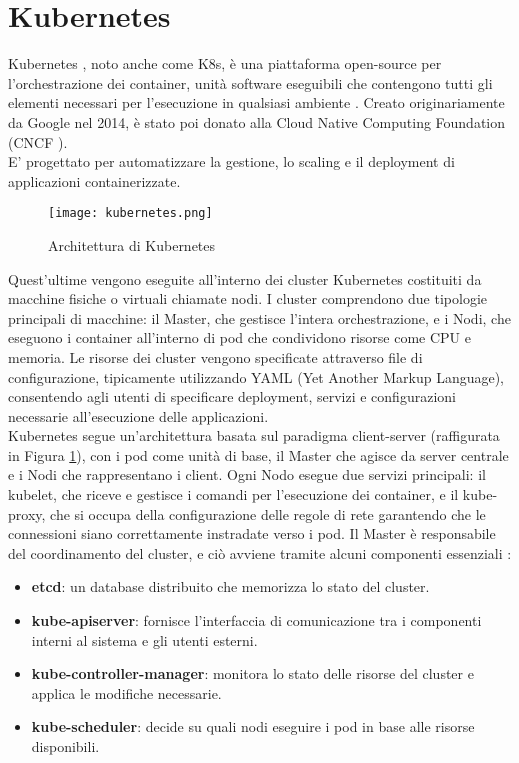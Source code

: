 \section{Kubernetes}
Kubernetes \cite{kubernetes}, noto anche come K8s, è una piattaforma open-source per l'orchestrazione dei container,
unità software eseguibili che contengono tutti gli elementi necessari per l'esecuzione in qualsiasi ambiente \cite{cont}.
Creato originariamente da Google nel 2014, è stato poi donato alla Cloud Native Computing Foundation (CNCF \cite{cncf}).
\\E' progettato per automatizzare la gestione, lo scaling e il deployment di applicazioni containerizzate.
\begin{figure}[h]
    \centering
   \texttt{[image: kubernetes.png]}
    \caption{Architettura di Kubernetes \cite{kubeart}}
    \label{fig:kube}
\end{figure}
Quest'ultime vengono eseguite all'interno dei cluster Kubernetes costituiti da macchine fisiche o virtuali chiamate nodi. 
I cluster comprendono due tipologie principali di macchine: il Master, che gestisce l'intera orchestrazione, e i Nodi, che eseguono i container all'interno di pod che condividono risorse come CPU e memoria.
Le risorse dei cluster vengono specificate attraverso file di configurazione, tipicamente utilizzando YAML (Yet Another Markup Language), consentendo agli utenti di specificare deployment, servizi e configurazioni necessarie all'esecuzione delle applicazioni.
\\Kubernetes segue un'architettura basata sul paradigma client-server (raffigurata in Figura \ref{fig:kube}), con i pod come unità di base, il Master che agisce da server centrale e i Nodi che rappresentano i client. 
Ogni Nodo esegue due servizi principali: il kubelet, che riceve e gestisce i comandi per l'esecuzione dei container, 
e il kube-proxy, che si occupa della configurazione delle regole di rete garantendo che le connessioni siano correttamente instradate verso i pod.
Il Master è responsabile del coordinamento del cluster, e ciò avviene tramite alcuni componenti essenziali \cite{kubeart}:
\begin{itemize}
    \item \textbf{etcd}: un database distribuito che memorizza lo stato del cluster.
    \item \textbf{kube-apiserver}: fornisce l'interfaccia di comunicazione tra i componenti interni al sistema e gli utenti esterni.
    \item \textbf{kube-controller-manager}: monitora lo stato delle risorse del cluster e applica le modifiche necessarie.
    \item \textbf{kube-scheduler}: decide su quali nodi eseguire i pod in base alle risorse disponibili.
\end{itemize}
